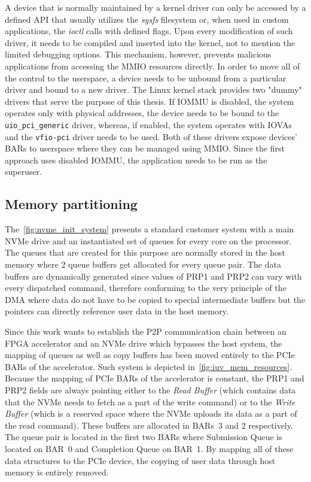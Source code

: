 A device that is normally maintained by a kernel driver can only be accessed by a defined API that
usually utilizes the \emph{sysfs} filesystem or, when used in custom applications, the \emph{ioctl}
calls with defined flags\cite{linux_drivers}. Upon every modification of such driver, it needs to be
compiled and inserted into the kernel, not to mention the limited debugging options. This
mechanism, however, prevents malicious applications from accessing the MMIO resources directly. In
order to move all of the control to the userspace, a device needs to be unbound from a particular
driver and bound to a new driver\footnotemark. The Linux kernel stack provides two "dummy" drivers
that serve the purpose of this thesis. If \ac{IOMMU} is disabled, the system operates only with
physical addresses, the device needs to be bound to the \verb|uio_pci_generic| driver, whereas, if
enabled, the system operates with \acp{IOVA} and the \verb|vfio-pci| driver needs to be used. Both
of these drivers expose devices' BARs to userspace where they can be managed using \ac{MMIO}.
Since the first approach uses disabled IOMMU, the application needs to be run as the
superuser\cite{kernel_usr_io,dpdk_usr_drivers,spdk_usp_drivers, spdk_dma}.


\subsection{Memory partitioning}

The~\cref{fig:nvme_init_system} presents a standard customer system with a main NVMe drive and an
instantiated set of queues for every core on the processor. The queues that are created for this
purpose are normally stored in the host memory where 2 queue buffers get allocated for every queue
pair. The data buffers are dynamically generated since values of \ac{PRP1} and \ac{PRP2} can vary
with every dispatched command, therefore conforming to the very principle of the \ac{DMA} where data
do not have to be copied to special intermediate buffers but the pointers can directly reference
user data in the host memory.

Since this work wants to establish the \ac{P2P} communication chain between an FPGA accelerator and
an NVMe drive which bypasses the host system, the mapping of queues as well as copy buffers has been
moved entirely to the PCIe BARs of the accelerator. Such system is depicted
in~\cref{fig:iuv_mem_resources}. Because the mapping of PCIe BARs of the accelerator is constant,
the \ac{PRP1} and \ac{PRP2} fields are always pointing either to the \emph{Read Buffer} (which
contains data that the NVMe needs to fetch as a part of the write command) or to the \emph{Write
Buffer} (which is a reserved space where the NVMe uploads its data as a part of the read command).
These buffers are allocated in BARs~3 and 2 respectively. The queue pair is located in the first two
\acp{BAR} where Submission Queue is located on BAR~0 and Completion Queue on BAR~1. By mapping all
of these data structures to the PCIe device, the copying of user data through host memory is
entirely removed.

